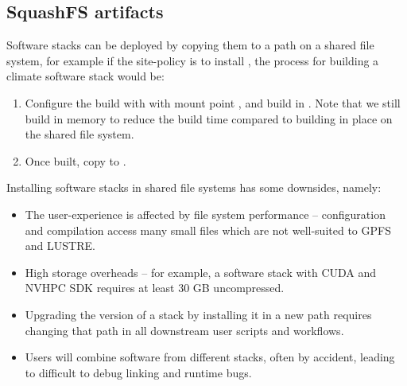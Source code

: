 \subsection{SquashFS artifacts}

Software stacks can be deployed by copying them to a path on a shared file system, for example if the site-policy is to install , the process for building a climate software stack  would be:
\begin{enumerate}
    \item Configure the build with  with mount point , and build in .
        Note that we still build in memory to reduce the build time compared to building in place on the shared file system.
    \item Once built, copy  to .
\end{enumerate}

Installing software stacks in shared file systems has some downsides, namely:
\begin{itemize}
    \item The user-experience is affected by file system performance -- configuration and compilation access many small files which are not well-suited to GPFS and LUSTRE.
    \item High storage overheads -- for example, a software stack with CUDA and NVHPC SDK requires at least 30 GB uncompressed.
    \item Upgrading the version of a stack by installing it in a new path requires changing that path in all downstream user scripts and workflows.
    \item Users will combine software from different stacks, often by accident, leading to difficult to debug linking and runtime bugs.
\end{itemize}

